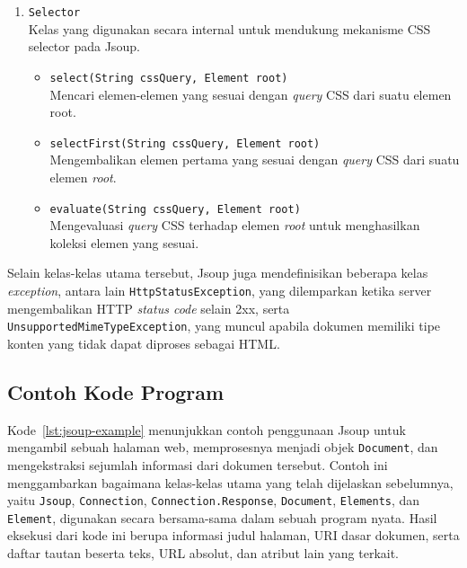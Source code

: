\begin{enumerate}[label=\alph*.]
    \item \texttt{Selector}\\
    Kelas yang digunakan secara internal untuk mendukung mekanisme CSS selector pada Jsoup.
    \begin{itemize}
        \item \texttt{select(String cssQuery, Element root)}\\
        Mencari elemen-elemen yang sesuai dengan \textit{query} CSS dari suatu elemen root.
        \item \texttt{selectFirst(String cssQuery, Element root)}\\
        Mengembalikan elemen pertama yang sesuai dengan \textit{query} CSS dari suatu elemen \textit{root}.
        \item \texttt{evaluate(String cssQuery, Element root)}\\
        Mengevaluasi \textit{query} CSS terhadap elemen \textit{root} untuk menghasilkan koleksi elemen yang sesuai.
    \end{itemize}
\end{enumerate}

\noindent Selain kelas-kelas utama tersebut, Jsoup juga mendefinisikan beberapa kelas \textit{exception}, antara lain \texttt{HttpStatusException}, yang dilemparkan ketika server mengembalikan HTTP \textit{status code} selain 2xx, serta \texttt{UnsupportedMimeTypeException}, yang muncul apabila dokumen memiliki tipe konten yang tidak dapat diproses sebagai HTML.

\subsection{Contoh Kode Program}
\label{subsec:0227-contoh-kode-program}

Kode~\ref{lst:jsoup-example} menunjukkan contoh penggunaan Jsoup untuk mengambil sebuah halaman web, memprosesnya menjadi objek \texttt{Document}, dan mengekstraksi sejumlah informasi dari dokumen tersebut. Contoh ini menggambarkan bagaimana kelas-kelas utama yang telah dijelaskan sebelumnya, yaitu \texttt{Jsoup}, \texttt{Connection}, \texttt{Connection.Response}, \texttt{Document}, \texttt{Elements}, dan \texttt{Element}, digunakan secara bersama-sama dalam sebuah program nyata. Hasil eksekusi dari kode ini berupa informasi judul halaman, URI dasar dokumen, serta daftar tautan beserta teks, URL absolut, dan atribut lain yang terkait.

